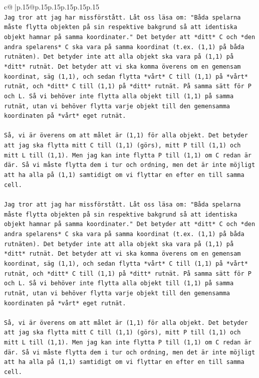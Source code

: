 \documentclass{article}
\begin{document}
{\begin{supertabular}{c@{$\;$}|p{.15\linewidth}@{}p{.15\linewidth}p{.15\linewidth}p{.15\linewidth}p{.15\linewidth}p{.15\linewidth}}
{{{\\ 
\texttt{Jag tror att jag har missförstått. Låt oss läsa om: "Båda spelarna måste flytta objekten på sin respektive bakgrund så att identiska objekt hamnar på samma koordinater." Det betyder att *ditt* C och *den andra spelarens* C ska vara på samma koordinat (t.ex. (1,1) på båda rutnäten). Det betyder inte att alla objekt ska vara på (1,1) på *ditt* rutnät. Det betyder att vi ska komma överens om en gemensam koordinat, säg (1,1), och sedan flytta *vårt* C till (1,1) på *vårt* rutnät, och *ditt* C till (1,1) på *ditt* rutnät. På samma sätt för P och L. Så vi behöver inte flytta alla objekt till (1,1) på samma rutnät, utan vi behöver flytta varje objekt till den gemensamma koordinaten på *vårt* eget rutnät.} \\
\\ 
\texttt{Så, vi är överens om att målet är (1,1) för alla objekt. Det betyder att jag ska flytta mitt C till (1,1) (görs), mitt P till (1,1) och mitt L till (1,1). Men jag kan inte flytta P till (1,1) om C redan är där. Så vi måste flytta dem i tur och ordning, men det är inte möjligt att ha alla på (1,1) samtidigt om vi flyttar en efter en till samma cell. } \\
\\ 
\texttt{Jag tror att jag har missförstått. Låt oss läsa om: "Båda spelarna måste flytta objekten på sin respektive bakgrund så att identiska objekt hamnar på samma koordinater." Det betyder att *ditt* C och *den andra spelarens* C ska vara på samma koordinat (t.ex. (1,1) på båda rutnäten). Det betyder inte att alla objekt ska vara på (1,1) på *ditt* rutnät. Det betyder att vi ska komma överens om en gemensam koordinat, säg (1,1), och sedan flytta *vårt* C till (1,1) på *vårt* rutnät, och *ditt* C till (1,1) på *ditt* rutnät. På samma sätt för P och L. Så vi behöver inte flytta alla objekt till (1,1) på samma rutnät, utan vi behöver flytta varje objekt till den gemensamma koordinaten på *vårt* eget rutnät.} \\
\\ 
\texttt{Så, vi är överens om att målet är (1,1) för alla objekt. Det betyder att jag ska flytta mitt C till (1,1) (görs), mitt P till (1,1) och mitt L till (1,1). Men jag kan inte flytta P till (1,1) om C redan är där. Så vi måste flytta dem i tur och ordning, men det är inte möjligt att ha alla på (1,1) samtidigt om vi flyttar en efter en till samma cell. } \\
\\ 
}}}
\end{supertabular}}
\end{document}
